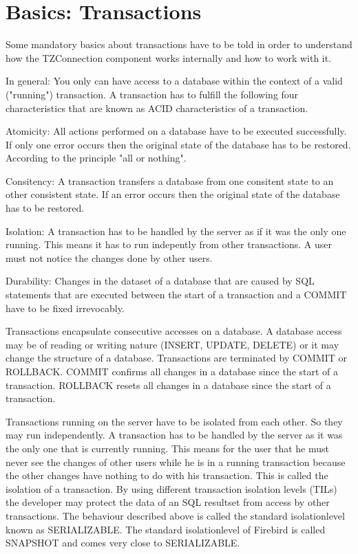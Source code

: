 \documentclass[a4paper,12pt,oneside]{book}
\begin{document}
\chapter{Basics: Transactions}
Some mandatory basics about transactions have to be told in order to understand how the TZConnection
component works internally and how to work with it.

In general: You only can have access to a database within the context of a valid ("running") transaction.
A transaction has to fulfill the following four characteristics that are known as ACID characteristics of a transaction.

Atomicity: All actions performed on a database have to be executed successfully.
If only one error occurs then the original state of the database has to be restored.
According to the principle "all or nothing".

Consitency: A transaction transfers a database from one consitent state to an other consistent state.
If an error occurs then the original state of the database has to be restored.

Isolation: A transaction has to be handled by the server as if it was the only one running.
This means it has to run indepently from other transactions.
A user must not notice the changes done by other users.

Durability: Changes in the dataset of a database that are caused by SQL statements that are executed between the start of a transaction and a COMMIT have to be fixed irrevocably.

Transactions encapsulate consecutive accesses on a database.
A database access may be of reading or writing nature (INSERT, UPDATE, DELETE) or it may change the structure of a database.
Transactions are terminated by COMMIT or ROLLBACK.
COMMIT confirms all changes in a database since the start of a transaction.
ROLLBACK resets all changes in a database since the start of a transaction.

Transactions running on the server have to be isolated from each other.
So they may run independently.
A transaction has to be handled by the server as it was the only one that is currently running.
This means for the user that he must never see the changes of other users while he is in a running transaction because the other changes have nothing to do with his transaction.
This is called the isolation of a transaction.
By using different transaction isolation levels (TILs) the developer may protect the data of an SQL resultset from access by other transactions.
The behaviour described above is called the standard isolationlevel known as SERIALIZABLE.
The standard isolationlevel of Firebird is called SNAPSHOT and comes very close to SERIALIZABLE.
\end{document}

